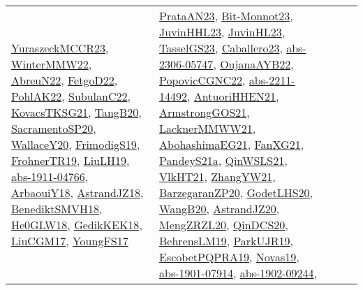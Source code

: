 {\begin{longtable}{lp{3cm}>{\raggedright}p{6cm}>{\raggedright}p{6cm}p{8cm}}
\href{articles/YuraszeckMCCR23.pdf}{YuraszeckMCCR23}\cite{YuraszeckMCCR23}, \href{papers/WinterMMW22.pdf}{WinterMMW22}\cite{WinterMMW22}, \href{articles/AbreuN22.pdf}{AbreuN22}\cite{AbreuN22}, \href{articles/FetgoD22.pdf}{FetgoD22}\cite{FetgoD22}, \href{articles/PohlAK22.pdf}{PohlAK22}\cite{PohlAK22}, \href{articles/SubulanC22.pdf}{SubulanC22}\cite{SubulanC22}, \href{papers/KovacsTKSG21.pdf}{KovacsTKSG21}\cite{KovacsTKSG21}, \href{papers/TangB20.pdf}{TangB20}\cite{TangB20}, \href{articles/SacramentoSP20.pdf}{SacramentoSP20}\cite{SacramentoSP20}, \href{articles/WallaceY20.pdf}{WallaceY20}\cite{WallaceY20}, \href{papers/FrimodigS19.pdf}{FrimodigS19}\cite{FrimodigS19}, \href{papers/FrohnerTR19.pdf}{FrohnerTR19}\cite{FrohnerTR19}, \href{papers/LiuLH19.pdf}{LiuLH19}\cite{LiuLH19}, \href{articles/abs-1911-04766.pdf}{abs-1911-04766}\cite{abs-1911-04766}, \href{papers/ArbaouiY18.pdf}{ArbaouiY18}\cite{ArbaouiY18}, \href{papers/AstrandJZ18.pdf}{AstrandJZ18}\cite{AstrandJZ18}, \href{papers/BenediktSMVH18.pdf}{BenediktSMVH18}\cite{BenediktSMVH18}, \href{papers/He0GLW18.pdf}{He0GLW18}\cite{He0GLW18}, \href{articles/GedikKEK18.pdf}{GedikKEK18}\cite{GedikKEK18}, \href{papers/LiuCGM17.pdf}{LiuCGM17}\cite{LiuCGM17}, \href{papers/YoungFS17.pdf}{YoungFS17}\cite{YoungFS17} & \href{articles/PrataAN23.pdf}{PrataAN23}\cite{PrataAN23}, \href{papers/Bit-Monnot23.pdf}{Bit-Monnot23}\cite{Bit-Monnot23}, \href{papers/JuvinHHL23.pdf}{JuvinHHL23}\cite{JuvinHHL23}, \href{papers/JuvinHL23.pdf}{JuvinHL23}\cite{JuvinHL23}, \href{papers/TasselGS23.pdf}{TasselGS23}\cite{TasselGS23}, \href{articles/Caballero23.pdf}{Caballero23}\cite{Caballero23}, \href{articles/abs-2306-05747.pdf}{abs-2306-05747}\cite{abs-2306-05747}, \href{papers/OujanaAYB22.pdf}{OujanaAYB22}\cite{OujanaAYB22}, \href{papers/PopovicCGNC22.pdf}{PopovicCGNC22}\cite{PopovicCGNC22}, \href{articles/abs-2211-14492.pdf}{abs-2211-14492}\cite{abs-2211-14492}, \href{papers/AntuoriHHEN21.pdf}{AntuoriHHEN21}\cite{AntuoriHHEN21}, \href{papers/ArmstrongGOS21.pdf}{ArmstrongGOS21}\cite{ArmstrongGOS21}, \href{papers/LacknerMMWW21.pdf}{LacknerMMWW21}\cite{LacknerMMWW21}, \href{articles/AbohashimaEG21.pdf}{AbohashimaEG21}\cite{AbohashimaEG21}, \href{articles/FanXG21.pdf}{FanXG21}\cite{FanXG21}, \href{articles/PandeyS21a.pdf}{PandeyS21a}\cite{PandeyS21a}, \href{articles/QinWSLS21.pdf}{QinWSLS21}\cite{QinWSLS21}, \href{articles/VlkHT21.pdf}{VlkHT21}\cite{VlkHT21}, \href{articles/ZhangYW21.pdf}{ZhangYW21}\cite{ZhangYW21}, \href{papers/BarzegaranZP20.pdf}{BarzegaranZP20}\cite{BarzegaranZP20}, \href{papers/GodetLHS20.pdf}{GodetLHS20}\cite{GodetLHS20}, \href{papers/WangB20.pdf}{WangB20}\cite{WangB20}, \href{articles/AstrandJZ20.pdf}{AstrandJZ20}\cite{AstrandJZ20}, \href{articles/MengZRZL20.pdf}{MengZRZL20}\cite{MengZRZL20}, \href{articles/QinDCS20.pdf}{QinDCS20}\cite{QinDCS20}, \href{papers/BehrensLM19.pdf}{BehrensLM19}\cite{BehrensLM19}, \href{papers/ParkUJR19.pdf}{ParkUJR19}\cite{ParkUJR19}, \href{articles/EscobetPQPRA19.pdf}{EscobetPQPRA19}\cite{EscobetPQPRA19}, \href{articles/Novas19.pdf}{Novas19}\cite{Novas19}, \href{articles/abs-1901-07914.pdf}{abs-1901-07914}\cite{abs-1901-07914}, \href{articles/abs-1902-09244.pdf}{abs-1902-09244}\cite{abs-1902-09244}, 
\end{longtable}}
